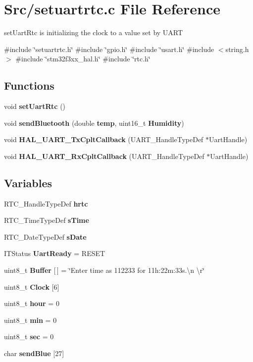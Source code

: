 \section{Src/setuartrtc.c File Reference}
\label{setuartrtc_8c}


set\+Uart\+Rtc is initializing the clock to a value set by U\+A\+RT  


{\ttfamily \#include \char`\"{}setuartrtc.\+h\char`\"{}}\newline
{\ttfamily \#include \char`\"{}gpio.\+h\char`\"{}}\newline
{\ttfamily \#include \char`\"{}usart.\+h\char`\"{}}\newline
{\ttfamily \#include $<$string.\+h$>$}\newline
{\ttfamily \#include \char`\"{}stm32f3xx\+\_\+hal.\+h\char`\"{}}\newline
{\ttfamily \#include \char`\"{}rtc.\+h\char`\"{}}\newline
\subsection*{Functions}
\begin{DoxyCompactItemize}
\item 
void \textbf{ set\+Uart\+Rtc} ()
\item 
void \textbf{ send\+Bluetooth} (double \textbf{ temp}, uint16\+\_\+t \textbf{ Humidity})
\item 
void \textbf{ H\+A\+L\+\_\+\+U\+A\+R\+T\+\_\+\+Tx\+Cplt\+Callback} (U\+A\+R\+T\+\_\+\+Handle\+Type\+Def $\ast$Uart\+Handle)
\item 
void \textbf{ H\+A\+L\+\_\+\+U\+A\+R\+T\+\_\+\+Rx\+Cplt\+Callback} (U\+A\+R\+T\+\_\+\+Handle\+Type\+Def $\ast$Uart\+Handle)
\end{DoxyCompactItemize}
\subsection*{Variables}
\begin{DoxyCompactItemize}
\item 
R\+T\+C\+\_\+\+Handle\+Type\+Def \textbf{ hrtc}
\item 
R\+T\+C\+\_\+\+Time\+Type\+Def \textbf{ s\+Time}
\item 
R\+T\+C\+\_\+\+Date\+Type\+Def \textbf{ s\+Date}
\item 
I\+T\+Status \textbf{ Uart\+Ready} = R\+E\+S\+ET
\item 
uint8\+\_\+t \textbf{ Buffer} [$\,$] = \char`\"{}Enter time as 112233 for 11h\+:22m\+:33s.\textbackslash{}n \textbackslash{}r\char`\"{}
\item 
uint8\+\_\+t \textbf{ Clock} [6]
\item 
uint8\+\_\+t \textbf{ hour} = 0
\item 
uint8\+\_\+t \textbf{ min} = 0
\item 
uint8\+\_\+t \textbf{ sec} = 0
\item 
char \textbf{ send\+Blue} [27]
\end{DoxyCompactItemize}


